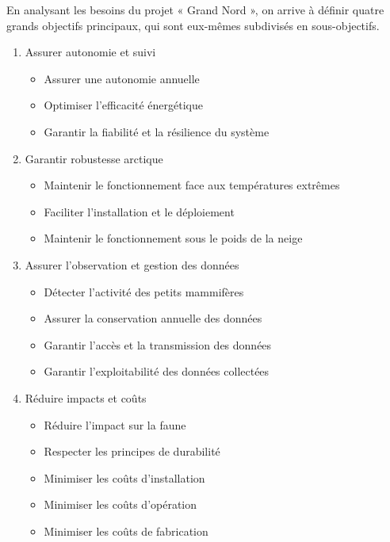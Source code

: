 En analysant les besoins du projet « Grand Nord »,
on arrive à définir quatre grands objectifs principaux, qui sont eux-mêmes subdivisés en sous-objectifs.

\begin{enumerate}

\item Assurer autonomie et suivi
\begin{itemize}[label=--]
    \item Assurer une autonomie annuelle
    \item Optimiser l'efficacité énergétique
    \item Garantir la fiabilité et la résilience du système
\end{itemize}

\item Garantir robustesse arctique
\begin{itemize}[label=--]
    \item Maintenir le fonctionnement face aux températures extrêmes
    \item Faciliter l'installation et le déploiement
    \item Maintenir le fonctionnement sous le poids de la neige
\end{itemize}

\item Assurer l'observation et gestion des données
\begin{itemize}[label=--]
    \item Détecter l'activité des petits mammifères
    \item Assurer la conservation annuelle des données
    \item Garantir l'accès et la transmission des données
    \item Garantir l'exploitabilité des données collectées
\end{itemize}

\item Réduire impacts et coûts
\begin{itemize}[label=--]
    \item Réduire l'impact sur la faune
    \item Respecter les principes de durabilité
    \item Minimiser les coûts d'installation
    \item Minimiser les coûts d'opération
    \item Minimiser les coûts de fabrication
\end{itemize}

\end{enumerate}

